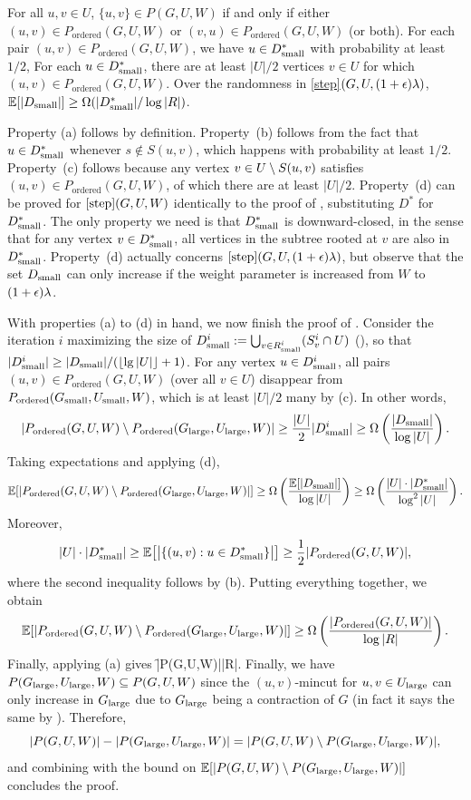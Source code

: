 \BE
\im[(a)] For all $u,v\in U$, $\{u,v\}\in P(G,U,W)$ if and only if either $(u,v)\in P_{\text{ordered}}(G,U,W)$ or $(v,u)\in P_{\text{ordered}}(G,U,W)$ (or both).
\im[(b)] For each pair $(u,v)\in P_{\text{ordered}}(G,U,W)$, we have $u\in D^*_{\textup{small}}$ with probability at least $1/2$,
\im[(c)] For each $u\in D^*_{\textup{small}}$, there are at least $|U|/2$ vertices $v\in U$ for which $(u,v)\in P_{\text{ordered}}(G,U,W)$.
\im[(d)] Over the randomness in \ref{step}$(G,U,(1+\epsilon)\lambda)$, $\mathbb E[|D_{\textup{small}}|]\ge\Omega(|D^*_{\textup{small}}|/\log|R|)$.
\EE

Property (a) follows by definition.
Property~(b) follows from the fact that $u\in D^*_{\textup{small}}$ whenever $s\notin S(u,v)$, which happens with probability at least $1/2$. 
Property~(c) follows because any vertex $v\in U\setminus S(u,v)$ satisfies $(u,v)\in P_{\text{ordered}}(G,U,W)$, of which there are at least $|U|/2$. Property~(d) can be proved for $\ref{step}(G,U,W)$ identically to the proof of , substituting $D^*$ for $D^*_{\textup{small}}$. The only property we need is that $D^*_{\textup{small}}$ is downward-closed, in the sense that for any vertex $v\in D^*_{\textup{small}}$, all vertices in the subtree rooted at $v$ are also in $D^*_{\textup{small}}$. Property~(d) actually concerns $\ref{step}(G,U,(1+\epsilon)\lambda)$, but observe that the set $D_{\textup{small}}$ can only increase if the weight parameter is increased from $W$ to $(1+\epsilon)\lambda$.

With properties (a) to (d) in hand, we now finish the proof of . Consider the iteration $i$ maximizing the size of $D^i_{\textup{small}} := \bigcup_{v\in R^i_{\textup{small}}} (S^i_v\cap U)$ (), so that $|D^i_{\textup{small}}|\ge|D_{\textup{small}}|/(\lfloor\lg|U|\rfloor+1)$. For any vertex $u\in D^i_{\textup{small}}$, all pairs $(u,v)\in P_{\text{ordered}}(G,U,W)$ (over all $v\in U$) disappear from $P_{\text{ordered}}(G_{\textup{small}},U_{\textup{small}},W)$, which is at least $|U|/2$ many by (c). In other words, 
\[ |P_{\text{ordered}}(G,U,W)\setminus P_{\text{ordered}}(G_{\textup{large}},U_{\textup{large}},W)| \ge \frac{|U|}2|D^i_{\textup{small}}| \ge\Omega\left(\frac{|D_{\textup{small}}|}{\log|U|}\right)   .\]
Taking expectations and applying (d), 
\[ \mathbb E[|P_{\text{ordered}}(G,U,W)\setminus P_{\text{ordered}}(G_{\textup{large}},U_{\textup{large}},W)|] \ge\Omega\left(\frac{\mathbb E[|D_{\textup{small}}|]}{\log|U|}\right)    \ge \Omega\left(\frac{|U|\cdot|D^*_{\textup{small}}|}{\log^2|U|}\right)  .\]
Moreover,
\[ |U|\cdot|D^*_{\textup{small}}| \ge \mathbb E\big[\big| \{(u,v): u\in D^*_{\textup{small}}\} \big|\big] \ge \frac12|P_{\text{ordered}}(G,U,W)|,  \]
where the second inequality follows by (b). Putting everything together, we obtain
\[ \mathbb E[|P_{\text{ordered}}(G,U,W)\setminus P_{\text{ordered}}(G_{\textup{large}},U_{\textup{large}},W)|] \ge \Omega\left(\frac{|P_{\text{ordered}}(G,U,W)|}{\log|R|}\right)   .\]
Finally, applying (a) gives
\BG {} \ge \Om\lp\f{|P(G,U,W)|}{\log|R|}\rp .\nonumber%
\EG
Finally, we have $P(G_{\textup{large}},U_{\textup{large}},W) \subseteq P(G,U,W)$ since the $(u,v)$-mincut for $u,v\in U_{\textup{large}}$ can only increase in $G_{\textup{large}}$ due to $G_{\textup{large}}$ being a contraction of $G$ (in fact it says the same by ). Therefore,
\[ |P(G,U,W)| - |P(G_{\textup{large}},U_{\textup{large}},W)| = |P(G,U,W) \setminus P(G_{\textup{large}},U_{\textup{large}},W)| ,\]
and combining with the bound on $\mathbb E[|P(G,U,W) \setminus P(G_{\textup{large}},U_{\textup{large}},W)|]$ concludes the proof.
\EP

